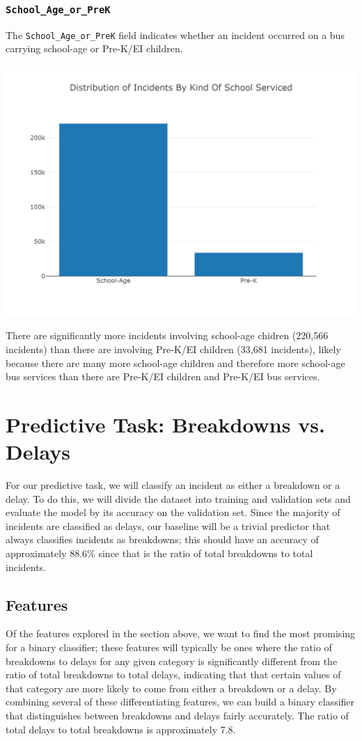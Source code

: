 \documentclass[11pt]{article}
\begin{document}
\subsubsection{\texttt{School\_Age\_or\_PreK}}
The \texttt{School\_Age\_or\_PreK} field indicates whether an incident occurred on a bus carrying school-age or Pre-K/EI children.
\begin{center}
\includegraphics[width=5.25in]{images/school_type.png}
\end{center}
There are significantly more incidents involving school-age chidren (220,566 incidents) than there are involving Pre-K/EI children (33,681 incidents), likely because there are many more school-age children and therefore more school-age bus services than there are Pre-K/EI children and Pre-K/EI bus services.

\newpage
\section{Predictive Task: Breakdowns vs. Delays}	
For our predictive task, we will classify an incident as either a breakdown or a delay. To do this, we will divide the dataset into training and validation sets and evaluate the model by its accuracy on the validation set. Since the majority of incidents are classified as delays, our baseline will be a trivial predictor that always classifies incidents as breakdowns; this should have an accuracy of approximately 88.6\% since that is the ratio of total breakdowns to total incidents.

\subsection{Features}
Of the features explored in the section above, we want to find the most promising for a binary classifier; these features will typically be ones where the ratio of breakdowns to delays for any given category is significantly different from the ratio of total breakdowns to total delays, indicating that that certain values of that category are more likely to come from either a breakdown or a delay. By combining several of these differentiating features, we can build a binary classifier that distinguishes between breakdowns and delays fairly accurately. The ratio of total delays to total breakdowns is approximately 7.8.
\end{document}
